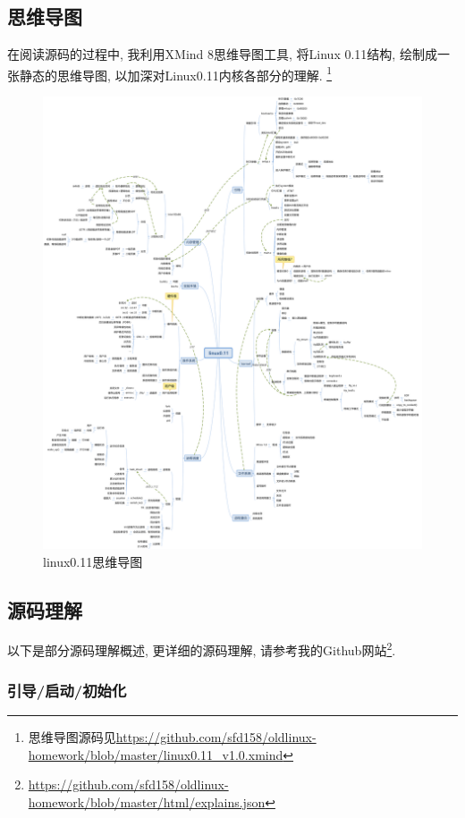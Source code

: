 \documentclass{ctexart}
\begin{document}
\subsection{思维导图}
在阅读源码的过程中, 我利用XMind 8思维导图工具, 将Linux 0.11结构, 绘制成一张静态的思维导图, 以加深对Linux0.11内核各部分的理解. \footnote{思维导图源码见\url{https://github.com/sfd158/oldlinux-homework/blob/master/linux0.11_v1.0.xmind}}
\begin{figure}
	\centering
	\includegraphics[width=\textwidth,natwidth=2722 ,natheight=3249]{img/linux0.11.pdf}
	\caption[]{linux0.11思维导图}
	\label{fig:linuxgraph}
\end{figure}

\subsection{源码理解}
以下是部分源码理解概述, 更详细的源码理解, 请参考我的Github网站\footnote{\url{https://github.com/sfd158/oldlinux-homework/blob/master/html/explains.json}}.
\subsubsection{引导/启动/初始化}
\end{document}
